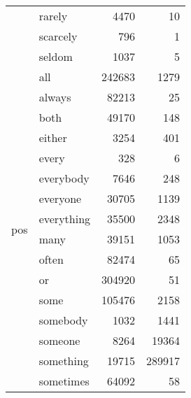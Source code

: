 \begin{longtable}[ht]{llrr}
 & rarely & {\cellcolor[HTML]{FDFED5}} \color[HTML]{000000} 4470 & {\cellcolor[HTML]{FFFFD9}} \color[HTML]{000000} 10 \\
 & scarcely & {\cellcolor[HTML]{FFFFD9}} \color[HTML]{000000} 796 & {\cellcolor[HTML]{FFFFD9}} \color[HTML]{000000} 1 \\
 & seldom & {\cellcolor[HTML]{FFFFD9}} \color[HTML]{000000} 1037 & {\cellcolor[HTML]{FFFFD9}} \color[HTML]{000000} 5 \\
\cline{1-4}
\multirow[c]{16}{*}{pos} & all & {\cellcolor[HTML]{234FA1}} \color[HTML]{F1F1F1} 242683 & {\cellcolor[HTML]{FEFFD8}} \color[HTML]{000000} 1279 \\
 & always & {\cellcolor[HTML]{BDE5B5}} \color[HTML]{000000} 82213 & {\cellcolor[HTML]{FFFFD9}} \color[HTML]{000000} 25 \\
 & both & {\cellcolor[HTML]{E2F4B2}} \color[HTML]{000000} 49170 & {\cellcolor[HTML]{FFFFD9}} \color[HTML]{000000} 148 \\
 & either & {\cellcolor[HTML]{FEFFD6}} \color[HTML]{000000} 3254 & {\cellcolor[HTML]{FFFFD9}} \color[HTML]{000000} 401 \\
 & every & {\cellcolor[HTML]{FFFFD9}} \color[HTML]{000000} 328 & {\cellcolor[HTML]{FFFFD9}} \color[HTML]{000000} 6 \\
 & everybody & {\cellcolor[HTML]{FCFED1}} \color[HTML]{000000} 7646 & {\cellcolor[HTML]{FFFFD9}} \color[HTML]{000000} 248 \\
 & everyone & {\cellcolor[HTML]{F1FABA}} \color[HTML]{000000} 30705 & {\cellcolor[HTML]{FEFFD8}} \color[HTML]{000000} 1139 \\
 & everything & {\cellcolor[HTML]{EFF9B5}} \color[HTML]{000000} 35500 & {\cellcolor[HTML]{FEFFD6}} \color[HTML]{000000} 2348 \\
 & many & {\cellcolor[HTML]{EDF8B1}} \color[HTML]{000000} 39151 & {\cellcolor[HTML]{FFFFD9}} \color[HTML]{000000} 1053 \\
 & often & {\cellcolor[HTML]{BBE4B5}} \color[HTML]{000000} 82474 & {\cellcolor[HTML]{FFFFD9}} \color[HTML]{000000} 65 \\
 & or & {\cellcolor[HTML]{081D58}} \color[HTML]{F1F1F1} 304920 & {\cellcolor[HTML]{FFFFD9}} \color[HTML]{000000} 51 \\
 & some & {\cellcolor[HTML]{90D4B9}} \color[HTML]{000000} 105476 & {\cellcolor[HTML]{FEFFD8}} \color[HTML]{000000} 2158 \\
 & somebody & {\cellcolor[HTML]{FFFFD9}} \color[HTML]{000000} 1032 & {\cellcolor[HTML]{FEFFD8}} \color[HTML]{000000} 1441 \\
 & someone & {\cellcolor[HTML]{FCFED1}} \color[HTML]{000000} 8264 & {\cellcolor[HTML]{F5FBC4}} \color[HTML]{000000} 19364 \\
 & something & {\cellcolor[HTML]{F6FBC5}} \color[HTML]{000000} 19715 & {\cellcolor[HTML]{081D58}} \color[HTML]{F1F1F1} 289917 \\
 & sometimes & {\cellcolor[HTML]{D4EEB3}} \color[HTML]{000000} 64092 & {\cellcolor[HTML]{FFFFD9}} \color[HTML]{000000} 58 \\
\cline{1-4}
\end{longtable}
